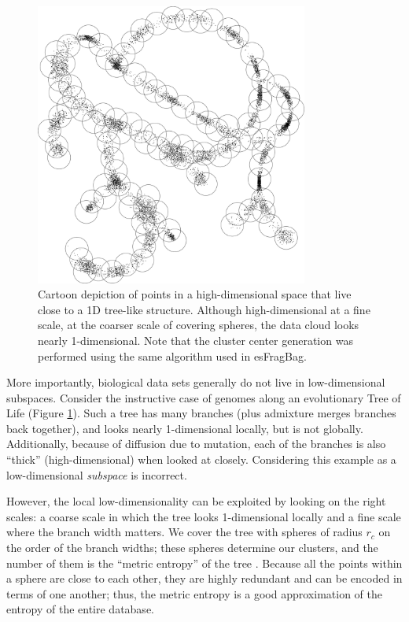 \documentclass[review,preprint,12pt]{elsarticle}
\renewcommand{\cite}{\citep} %
\theoremstyle{definition}
\theoremstyle{remark}
\numberwithin{equation}{section}
\begin{document}
\begin{figure}[btp]
    \centering
    \includegraphics[width=0.8\textwidth]{assets/treepoints/treepoints2D_clusters.png}
    \caption{Cartoon depiction of points in a high-dimensional space that live close to a 1D tree-like structure. Although high-dimensional at a fine scale, at the coarser scale of covering spheres, the data cloud looks nearly 1-dimensional. Note that the cluster center generation was performed using the same algorithm used in esFragBag.}
    \label{fig:tree}
\end{figure}
More importantly, biological data sets generally do not live in low-dimensional subspaces.
Consider the instructive case of genomes along an evolutionary Tree of Life (Figure \ref{fig:tree}).
Such a tree has many branches (plus admixture merges branches back together), and looks nearly 1-dimensional locally, but is not globally.
Additionally, because of diffusion due to mutation, each of the branches is also ``thick'' (high-dimensional) when looked at closely.
Considering this example as a low-dimensional \textit{subspace} is incorrect.

However, the local low-dimensionality can be exploited by looking on the right scales: a coarse scale in which the tree looks 1-dimensional locally and a fine scale where the branch width matters.
We cover the tree with spheres of radius $r_c$ on the order of the branch widths; these spheres determine our clusters, and the number of them is the ``metric entropy'' of the tree \cite{tao2008product}.
Because all the points within a sphere are close to each other, they are highly redundant and can be encoded in terms of one another; thus, the metric entropy is a good approximation of the entropy of the entire database.
\end{document}
